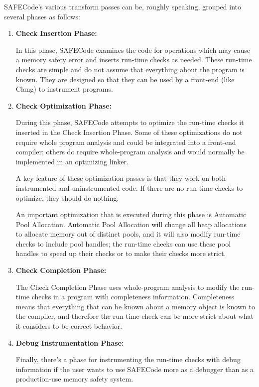 SAFECode's various transform passes can be, roughly speaking, grouped
into several phases as follows:

\begin{enumerate}
\item{\textbf{Check Insertion Phase:}}

In this phase, SAFECode examines the code for operations which may
cause a memory safety error and inserts run-time checks as needed.
These run-time checks are simple and do not assume that everything
about the program is known.  They are designed so that they can be
used by a front-end (like Clang) to instrument programs.

\item{\textbf{Check Optimization Phase:}}

During this phase, SAFECode attempts to optimize the run-time checks
it inserted in the Check Insertion Phase.  Some of these optimizations
do not require whole program analysis and could be integrated into a
front-end compiler; others do require whole-program analysis and would
normally be implemented in an optimizing linker.

A key feature of these optimization passes is that they work on both
instrumented and uninstrumented code.  If there are no run-time checks
to optimize, they should do nothing.

An important optimization that is executed during this phase is
Automatic Pool Allocation.  Automatic Pool Allocation will change all
heap allocations to allocate memory out of distinct pools, and it will
also modify run-time checks to include pool handles; the run-time
checks can use these pool handles to speed up their checks or to make
their checks more strict.

\item{\textbf{Check Completion Phase:}}

The Check Completion Phase uses whole-program analysis to modify the run-time
checks in a program with completeness information.  Completeness means
that everything that can be known about a memory object is known to
the compiler, and therefore the run-time check can be more strict
about what it considers to be correct behavior.

\item{\textbf{Debug Instrumentation Phase:}}

Finally, there's a phase for instrumenting the run-time checks with
debug information if the user wants to use SAFECode more as a debugger
than as a production-use memory safety system.
\end{enumerate}


